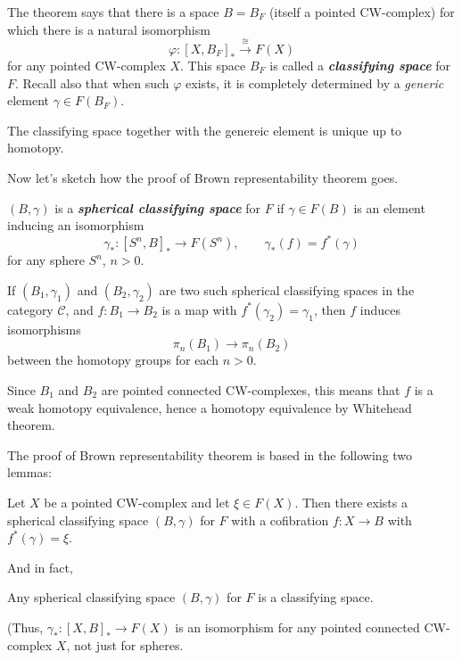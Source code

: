 \begin{remark}
\begin{definition}
\begin{remark}
	The theorem says that there is a space $B=B_{F}$ (itself a pointed CW-complex) for which there is a natural isomorphism
	$$\varphi :[X,B_{F}]_{*}\overset{\cong }{\longrightarrow}F(X)$$
	for any pointed CW-complex $X$. This space $B_{F}$ is called a \textit{\textbf{classifying space}} for $F$. Recall also that when such $\varphi$ exists, it is completely determined by a \textit{generic} element $\gamma\in F(B_{F})$.

	The classifying space together with the genereic element is unique up to homotopy.
\end{remark}

Now let's sketch how the proof of Brown representability theorem goes.

\begin{definition}
	$(B,\gamma)$ is a \textit{\textbf{spherical classifying space}} for $F$ if $\gamma\in F(B)$ is an element inducing an isomorphism
	$$\gamma_{*}:[S^{n},B]_{*}\to F(S^{n}),\qquad \gamma_{*}(f)=f^{*} (\gamma)$$
	for any sphere $S^{n}$, $n>0$.
\end{definition}

\begin{remark}
	If $(B_{1},\gamma_{1})$ and $(B_{2},\gamma_{2})$ are two such spherical classifying spaces in the category $\mathcal{C}$, and $f:B_{1}\to B_{2}$ is a map with $f^{*} (\gamma_{2})=\gamma_{1}$, then $f$ induces isomorphisms
	$$\pi_{n}(B_{1})\to \pi_{n}(B_{2})$$
	between the homotopy groups for each $n>0$.

	Since $B_{1}$ and $B_{2}$ are pointed connected CW-complexes, this means that $f$ is a weak homotopy equivalence, hence a homotopy equivalence by Whitehead theorem.
\end{remark}

The proof of Brown representability theorem is based in the following two lemmas:

\begin{lemma}
	Let $X$ be a pointed CW-complex and let $\xi \in F(X)$. Then there exists a spherical classifying space $(B,\gamma)$ for $F$ with a cofibration  $f:X\to B$ with $f^{*} (\gamma)=\xi$.
\end{lemma}

And in fact,

\begin{lemma}
	Any spherical classifying space $(B,\gamma)$ for $F$ is a classifying space.

	(Thus, $\gamma_{*}:[X,B]_{*}\to F(X)$ is an isomorphism for any pointed connected CW-complex $X$, not just for spheres.
\end{lemma}


\end{definition}
\end{remark}
